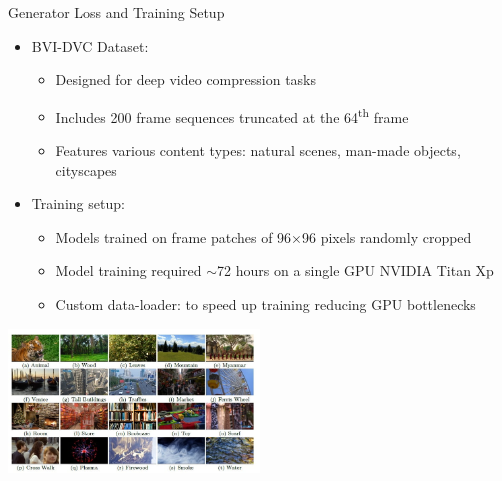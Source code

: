 \documentclass{beamer}
\begin{document}
\begin{frame}{Generator Loss and Training Setup}
\begin{itemize}
  \item BVI-DVC Dataset:
  \begin{itemize}
    \item Designed for deep video compression tasks
    \item Includes 200 frame sequences truncated at the 64\textsuperscript{th} frame
    \item Features various content types: natural scenes, man-made objects, cityscapes
  \end{itemize}
  \item Training setup:
  \begin{itemize}
    \item Models trained on frame patches of 96$\times$96 pixels randomly cropped
    \item Model training required $\sim$72 hours on a single GPU NVIDIA Titan Xp
    \item Custom data-loader: to speed up training reducing GPU bottlenecks
  \end{itemize}
\end{itemize}

\centering
\includegraphics[width=0.5\textwidth]{../thesis/static/BVI-DVC.jpg}

\end{frame}
\end{document}
